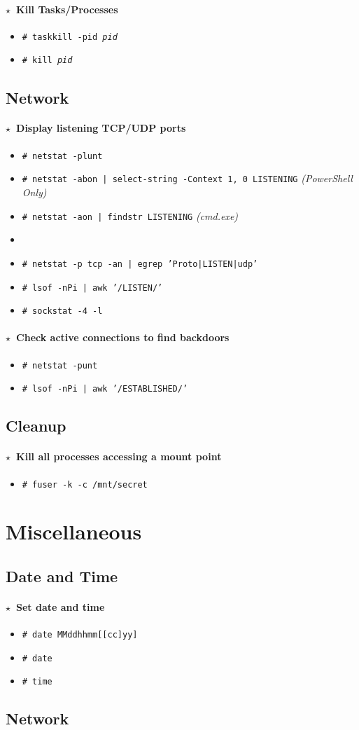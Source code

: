 \documentclass[10pt,landscape]{article}
\newcommand{\os}[1]{\texttt{\footnotesize{#1}}}
\newcommand{\unix}{\os{U}}
\newcommand{\freebsd}{\os{F}}
\newcommand{\bsd}{\os{B}}
\newcommand{\linux}{\os{L}}
\newcommand{\windows}{\os{W}}
\newenvironment{action}[1]
  {\paragraph{$\star$~#1}\begin{itemize}[leftmargin=1cm]}
  {\end{itemize}}
\newcommand{\cmd}[2]{\item[#1] {\small\tt\# #2}}
\newcommand{\tool}[2]{\item[#1] {\footnotesize\sc{#2}}\xspace}
\begin{document}
\begin{multicols*}{3}
\begin{action}{Kill Tasks/Processes}
\cmd{\windows}{taskkill -pid \emph{pid}}
\cmd{\linux\unix}{kill \emph{pid}}
\end{action}

\subsection*{Network}

\begin{action}{Display listening TCP/UDP ports}
\cmd{\linux\unix}{netstat -plunt}
\cmd{\windows}{netstat -abon | select-string -Context 1, 0 LISTENING} \emph{(PowerShell Only)}
\cmd{\windows}{netstat -aon | findstr LISTENING} \emph{(cmd.exe)}
\tool{\windows}{tcpview}
\cmd{\bsd}{netstat -p tcp -an | egrep 'Proto|LISTEN|udp'}
\cmd{\unix}{lsof -nPi | awk '/LISTEN/'}
\cmd{\freebsd}{sockstat -4 -l}
\end{action}

\begin{action}{Check active connections to find backdoors}
\cmd{\linux}{netstat -punt}
\cmd{\unix}{lsof -nPi | awk '/ESTABLISHED/'}
\end{action}

\subsection*{Cleanup}

\begin{action}{Kill all processes accessing a mount point}
\cmd{\unix}{fuser -k -c /mnt/secret}
\end{action}

\section*{Miscellaneous}

\subsection*{Date and Time}

\begin{action}{Set date and time}
\cmd{\unix}{date MMddhhmm[[cc]yy]}
\cmd{\windows}{date}
\cmd{\windows}{time}
\end{action}

\subsection*{Network}


\end{multicols*}
\end{document}
